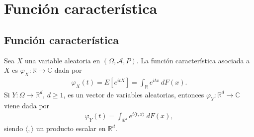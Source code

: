 \chapter{Función característica}

\section{Función característica}

\begin{defi}
    Sea $X$ una variable aleatoria en $(\Omega, \mathcal{A}, P)$. La función característica asociada a $X$ es $\varphi_X : \mathbb{R} \longrightarrow \mathbb{C}$ dada por
    \begin{align*}
        \varphi_X(t) = E\left[ e^{itX} \right] = \int_{\mathbb{R}} e^{itx} \ dF(x).
    \end{align*}
    Si $Y : \Omega \longrightarrow \mathbb{R}^d$, $d \ge 1$, es un vector de variables aleatorias, entonces $\varphi_Y : \mathbb{R}^d \longrightarrow \mathbb{C}$ viene dada por
    \begin{align*}
        \varphi_Y(t) = \int_{\mathbb{R}^d} e^{i\langle t,x\rangle} \ dF(x),
    \end{align*}
    siendo $\langle,\rangle$ un producto escalar en $\mathbb{R}^d$.
\end{defi}

